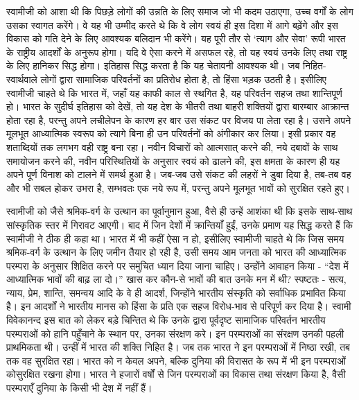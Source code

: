 स्वामीजी को आशा थी कि पिछड़े लोगों की उन्नति के लिए समाज जो भी कदम उठाएगा, उच्च वर्गों के लोग उसका स्वागत करेंगे। वे यह भी उम्मीद करते थे कि वे लोग स्वयं ही इस दिशा में आगे बढ़ेंगे और इस विकास को गति देने के लिए आवश्यक बलिदान भी करेंगे। यह पूरी तौर से ‘त्याग और सेवा’ रूपी भारत के राष्ट्रीय आदर्शों के अनुरूप होगा। यदि वे ऐसा करने में असफल रहे, तो यह स्वयं उनके लिए तथा राष्ट्र के लिए हानिकर सिद्ध होगा। इतिहास सिद्ध करता है कि यह चेतावनी आवश्यक थी। जब निहित-स्वार्थवाले लोगों द्वारा सामाजिक परिवर्तनों का प्रतिरोध होता है, तो हिंसा भड़क उठती है। इसीलिए स्वामीजी चाहते थे कि भारत में, जहाँ यह काफी काल से स्थगित है, यह परिवर्तन सहज तथा शान्तिपूर्ण हो। भारत के सुदीर्घ इतिहास को देखें, तो यह देश के भीतरी तथा बाहरी शक्तियों द्वारा बारम्बार आक्रान्त होता रहा है, परन्तु अपने लचीलेपन के कारण हर बार उस संकट पर विजय पा लेता रहा है। उसने अपने मूलभूत आध्यात्मिक स्वरूप को त्यागे बिना ही उन परिवर्तनों को अंगीकार कर लिया। इसी प्रकार वह शताब्दियों तक लगभग वही राष्ट्र बना रहा। नवीन विचारों को आत्मसात् करने की, नये दबावों के साथ समायोजन करने की, नवीन परिस्थितियों के अनुसार स्वयं को ढालने की, इस क्षमता के कारण ही यह अपने पूर्ण विनाश को टालने में समर्थ हुआ है। जब-जब उसे संकट की लहरों ने डुबा दिया है, तब-तब वह और भी सबल होकर उभरा है, सम्भवतः एक नये रूप में, परन्तु अपने मूलभूत भावों को सुरक्षित रहते हुए। 

{स्वामीजी को जैसे श्रमिक-वर्ग के उत्थान का पूर्वानुमान हुआ, वैसे ही उन्हें आशंका थी कि इसके साथ-साथ सांस्कृतिक स्तर में गिरावट आएगी। बाद में जिन देशों में क्रान्तियाँ हुईं, उनके प्रमाण यह सिद्ध करते हैं कि स्वामीजी ने ठीक ही कहा था। भारत में भी कहीं ऐसा न हो, इसीलिए स्वामीजी चाहते थे कि जिस समय श्रमिक-वर्ग के उत्थान के लिए जमीन तैयार हो रही है, उसी समय आम जनता को भारत की आध्यात्मिक परम्परा के अनुसार शिक्षित करने पर समुचित ध्यान दिया जाना चाहिए। उन्होंने आवाहन किया - “देश में आध्यात्मिक भावों की बाढ़ ला दो।” खास कर कौन-से भावों की बात उनके मन में थी? स्पष्टतः - सत्य, न्याय, प्रेम, शान्ति, समन्वय आदि के वे ही आदर्श, जिन्होंने भारतीय संस्कृति को सर्वाधिक प्रभावित किया है। इन आदर्शों ने भारतीय मानस को हिंसा के प्रति एक सहज विरोध-भाव से परिपूर्ण कर दिया है। स्वामी विवेकानन्द इस बात को लेकर बड़े चिन्तित थे कि उनके द्वारा पूर्वदृष्ट सामाजिक परिवर्तन भारतीय परम्पराओं को हानि पहुँचाने के स्थान पर, उनका संरक्षण करे। इन परम्पराओं का संरक्षण उनकी पहली प्राथमिकता थी। उन्हीं में भारत की शक्ति निहित है। जब तक भारत ने इन परम्पराओं में निष्ठा रखी, तब तक वह सुरक्षित रहा। भारत को न केवल अपने, बल्कि दुनिया की विरासत के रूप में भी इन परम्पराओं को\parfillskip=0pt}\newpage\noindent सुरक्षित रखना होगा। भारत ने हजारों वर्षों से जिन परम्पराओं का विकास तथा संरक्षण किया है, वैसी परम्पराएँ दुनिया के किसी भी देश में नहीं हैं।


